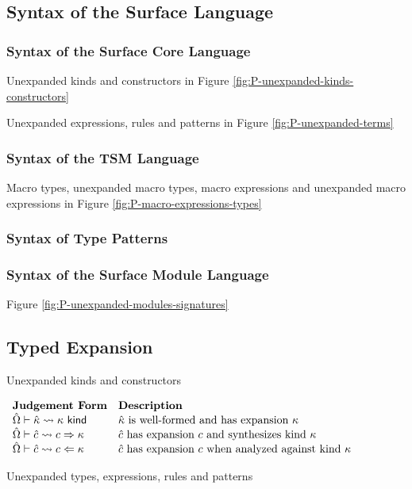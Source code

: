 \subsection{Syntax of the Surface Language}
\subsubsection{Syntax of the Surface Core Language}
Unexpanded kinds and constructors in Figure \ref{fig:P-unexpanded-kinds-constructors}

Unexpanded expressions, rules and patterns in Figure \ref{fig:P-unexpanded-terms}
\subsubsection{Syntax of the TSM Language}
Macro types, unexpanded macro types, macro expressions and unexpanded macro expressions in Figure \ref{fig:P-macro-expressions-types}
\subsubsection{Syntax of Type Patterns}
\subsubsection{Syntax of the Surface Module Language}
Figure \ref{fig:P-unexpanded-modules-signatures}

\subsection{Typed Expansion}
Unexpanded kinds and constructors

\vspace{10px}
$\begin{array}{ll}
\textbf{Judgement Form} & \textbf{Description}\\
{\hat\Omega} \vdash {\hat\kappa} \leadsto \kappa~\mathsf{kind} & \text{${\hat\kappa}$ is well-formed and has expansion $\kappa$}\\
{\hat\Omega} \vdash {\hat c} \leadsto c \Rightarrow \kappa & \text{${\hat c}$ has expansion $c$ and synthesizes kind $\kappa$}\\
{\hat\Omega} \vdash {\hat c} \leadsto c \Leftarrow \kappa & \text{${\hat c}$ has expansion $c$ when analyzed against kind $\kappa$}
\end{array}$
\vspace{10px}

Unexpanded types, expressions, rules and patterns

